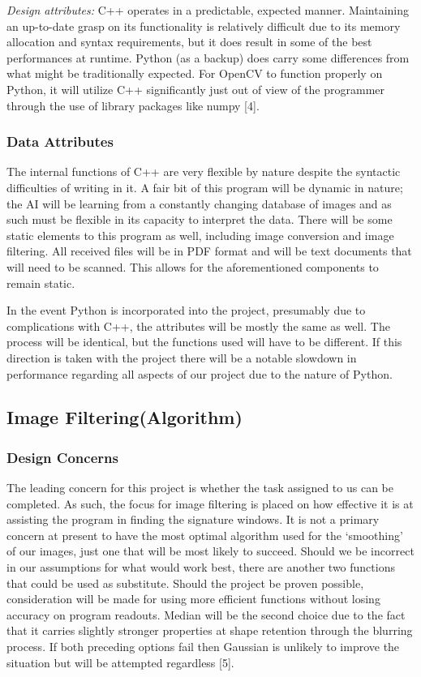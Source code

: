 \documentclass[onecolumn, draftclsnofoot,10pt, compsoc]{IEEEtran}
\begin{document}
		\emph{Design attributes:}
C++ operates in a predictable, expected manner. Maintaining an up-to-date grasp on its functionality is relatively difficult due to its memory allocation and syntax requirements, but it does result in some of the best performances at runtime. Python (as a backup) does carry some differences from what might be traditionally expected. For OpenCV to function properly on Python, it will utilize C++ significantly just out of view of the programmer through the use of library packages like numpy [4]. 


\subsubsection{Data Attributes}
The internal functions of C++ are very flexible by nature despite the syntactic difficulties of writing in it. A fair bit of this program will be dynamic in nature; the AI will be learning from a constantly changing database of images and as such must be flexible in its capacity to interpret the data. There will be some static elements to this program as well, including image conversion and image filtering. All received files will be in PDF format and will be text documents that will need to be scanned. This allows for the aforementioned components to remain static. 

In the event Python is incorporated into the project, presumably due to complications with C++, the attributes will be mostly the same as well. The process will be identical, but the functions used will have to be different. If this direction is taken with the project there will be a notable slowdown in performance regarding all aspects of our project due to the nature of Python.

\subsection{Image Filtering(Algorithm)}
\subsubsection{Design Concerns}
The leading concern for this project is whether the task assigned to us can be completed. As such, the focus for image filtering is placed on how effective it is at assisting the program in finding the signature windows. It is not a primary concern at present to have the most optimal algorithm used for the ‘smoothing’ of our images, just one that will be most likely to succeed. Should we be incorrect in our assumptions for what would work best, there are another two functions that could be used as substitute. Should the project be proven possible, consideration will be made for using more efficient functions without losing accuracy on program readouts. Median will be the second choice due to the fact that it carries slightly stronger properties at shape retention through the blurring process. If both preceding options fail then Gaussian is unlikely to improve the situation but will be attempted regardless [5].
\end{document}
